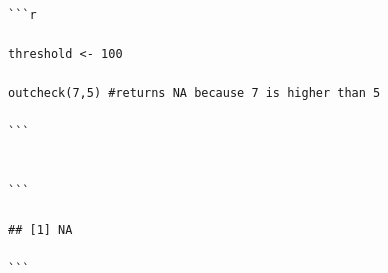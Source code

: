 \documentclass[]{book}
\begin{document}
\begin{verbatim}
                                                                                                                                                                                                                                                            ```r
                                                                                                                                                                                                                                                                                                                                                                                                                                                                                                                          threshold <- 100
                                                                                                                                                                                                                                                                                                                                                                                                                                                                                                                          outcheck(7,5) #returns NA because 7 is higher than 5
                                                                                                                                                                                                                                                            ```
                                                                                                                                                                                                                                                            
                                                                                                                                                                                                                                                            ```
                                                                                                                                                                                                                                                            ## [1] NA
                                                                                                                                                                                                                                                            ```
                                                                                                                                                                                                                                                          

\end{verbatim}
\end{document}
